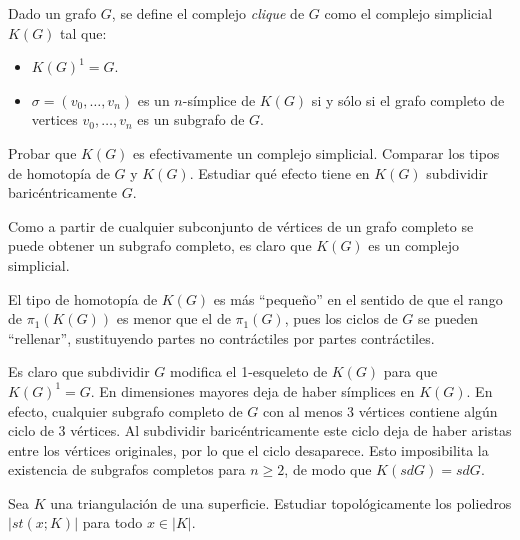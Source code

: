 \documentclass[twoside]{article}
\begin{document}
\newpage

\begin{ejercicio}{1.10}
Dado un grafo $G$, se define el complejo \emph{clique} de $G$ como el complejo simplicial $K(G)$ tal que:
\begin{itemize}
\item $K(G)^1 = G$.
\item $σ = (v_0,\dots,v_n)$ es un $n$-símplice de $K(G)$ si y sólo si el grafo completo de vertices $v_0,\dots,v_n$ es un subgrafo de $G$.
\end{itemize}
Probar que $K(G)$ es efectivamente un complejo simplicial.
Comparar los tipos de homotopía de $G$ y $K(G)$.
Estudiar qué efecto tiene en $K(G)$ subdividir baricéntricamente $G$.
\end{ejercicio}
\begin{solucion}
Como a partir de cualquier subconjunto de vértices de un grafo completo se puede obtener un subgrafo completo, es claro que $K(G)$ es un complejo simplicial. 

El tipo de homotopía de $K(G)$ es más ``pequeño'' en el sentido de que el rango de $\pi_1(K(G))$ es menor que el de $\pi_1(G)$, pues los ciclos de $G$ se pueden ``rellenar'', sustituyendo partes no contráctiles por partes contráctiles. 

Es claro que subdividir $G$ modifica el 1-esqueleto de $K(G)$ para que $K(G)^1=G$. En dimensiones mayores deja de haber símplices en $K(G)$. En efecto, cualquier subgrafo completo de $G$ con al menos 3 vértices contiene algún ciclo de 3 vértices. Al subdividir baricéntricamente este ciclo deja de haber aristas entre los vértices originales, por lo que el ciclo desaparece. Esto imposibilita la existencia de subgrafos completos para $n\geq 2$, de modo que $K(sdG)=sdG$. 
\end{solucion}

\newpage

\begin{ejercicio}{1.11}
Sea $K$ una triangulación de una superficie.
Estudiar topológicamente los poliedros $|st(x;K)|$ para todo $x \in |K|$.
\end{ejercicio}
\begin{solucion}
\end{solucion}

\newpage
\end{document}
